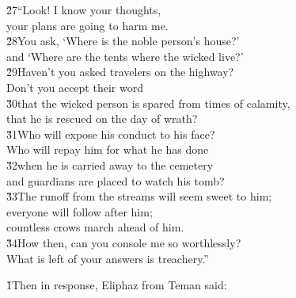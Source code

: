 \begin{poetry}
\poeml \v{27}``Look! I know your thoughts, \\
\poemll    your plans are going to harm me. \\
\poeml \v{28}You ask, `Where is the noble person's house?' \\
\poemll    and `Where are the tents where the wicked live?' \\
\poeml \v{29}Haven't you asked travelers on the highway? \\
\poemll    Don't you accept their word \\
\poeml \v{30}that the wicked person is spared from times of calamity, \\
\poemll    that he is rescued on the day of wrath? \\
\poeml \v{31}Who will expose his conduct to his face? \\
\poemll    Who will repay him for what he has done \\
\poeml \v{32}when he is carried away to the cemetery \\
\poemll    and guardians are placed to watch his tomb? \\
\poeml \v{33}The runoff from the streams will seem sweet to him; \\
\poemll    everyone will follow after him; \\
\poemlll       countless crows march ahead of him. \\
\poeml \v{34}How then, can you console me so worthlessly? \\
\poemll    What is left of your answers is treachery.''
\end{poetry}

\v{1}Then in response, Eliphaz from Teman said:

